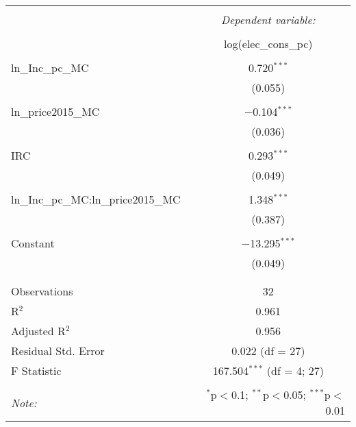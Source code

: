 
\begin{table}[!htbp] \centering 
  \caption{} 
  \label{} 
\begin{tabular}{@{\extracolsep{5pt}}lc} 
\\[-1.8ex]\hline 
\hline \\[-1.8ex] 
 & \multicolumn{1}{c}{\textit{Dependent variable:}} \\ 
\cline{2-2} 
\\[-1.8ex] & log(elec\_cons\_pc) \\ 
\hline \\[-1.8ex] 
 ln\_Inc\_pc\_MC & 0.720$^{***}$ \\ 
  & (0.055) \\ 
  & \\ 
 ln\_price2015\_MC & $-$0.104$^{***}$ \\ 
  & (0.036) \\ 
  & \\ 
 IRC & 0.293$^{***}$ \\ 
  & (0.049) \\ 
  & \\ 
 ln\_Inc\_pc\_MC:ln\_price2015\_MC & 1.348$^{***}$ \\ 
  & (0.387) \\ 
  & \\ 
 Constant & $-$13.295$^{***}$ \\ 
  & (0.049) \\ 
  & \\ 
\hline \\[-1.8ex] 
Observations & 32 \\ 
R$^{2}$ & 0.961 \\ 
Adjusted R$^{2}$ & 0.956 \\ 
Residual Std. Error & 0.022 (df = 27) \\ 
F Statistic & 167.504$^{***}$ (df = 4; 27) \\ 
\hline 
\hline \\[-1.8ex] 
\textit{Note:}  & \multicolumn{1}{r}{$^{*}$p$<$0.1; $^{**}$p$<$0.05; $^{***}$p$<$0.01} \\ 
\end{tabular} 
\end{table} 
